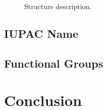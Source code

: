 \documentclass[
	11pt,
	letterpaper,
]{article}
\begin{document}

\begin{figure}[htbp]
	\centering
	\caption{Structure description.}
	\label{fig:structure1}
\end{figure}


\subsection{IUPAC Name}


\subsection{Functional Groups}


\section{Conclusion}


\vspace{1em}

\end{document}
